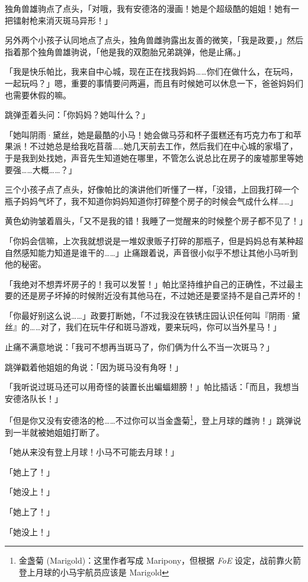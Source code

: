 独角兽雄驹点了点头，「对哦，我有安德洛的漫画！她是个超级酷的姐姐！她有一把镭射枪来消灭斑马异形！」

另外两个小孩子认同地点了点头，独角兽雌驹露出友善的微笑，「我是政要，」然后指着那个独角兽雄驹说，「他是我的双胞胎兄弟跳弹，他是止痛。」

「我是快乐帕比，我来自中心城，现在正在找我妈妈……你们在做什么，在玩吗，一起玩吗？」嗯，重要的事情要问两遍，而且有时候她可以休息一下，爸爸妈妈们也需要休假的嘛。

跳弹歪着头问：「你妈妈？她叫什么？」

「她叫阴雨·黛丝，她是最酷的小马！她会做马芬和杯子蛋糕还有巧克力布丁和苹果派！不过她总是给我吃苜蓿……她几天前去工作，然后我们在中心城的家塌了，于是我到处找她，声音先生知道她在哪里，不管怎么说总比在房子的废墟那里等她要强……大概……？」

三个小孩子点了点头，好像帕比的演讲他们听懂了一样，「没错，上回我打碎一个瓶子妈妈气坏了，我不知道你妈妈知道你打碎整个房子的时候会气成什么样……」

黄色幼驹皱着眉头，「又不是我的错！我睡了一觉醒来的时候整个房子都不见了！」

「你妈会信嘛，上次我就想说是一堆奴隶贩子打碎的那瓶子，但是妈妈总有某种超自然感知能力知道是谁干的……」止痛跟着说，声音很小似乎不想让其他小马听到他的秘密。

「我绝对不想弄坏房子的！我可以发誓！」帕比坚持维护自己的正确性，不过最主要的还是房子坏掉的时候附近没有其他马在，不过她还是要坚持不是自己弄坏的！

「你最好别这么说……」政要打断她，「不过我没在铁锈庄园认识任何叫『阴雨·黛丝』的……对了，我们在玩牛仔和斑马游戏，要来玩吗，你可以当外星马！」

止痛不满意地说：「我可不想再当斑马了，你们俩为什么不当一次斑马？」

跳弹戳着他姐姐的角说：「因为斑马没有角呀！」

「我听说过斑马还可以用奇怪的装置长出蝙蝠翅膀！」帕比插话：「而且，我想当安德洛队长！」

「但是你又没有安德洛的枪……不过你可以当金盏菊\footnote{金盏菊 (Marigold)：这里作者写成 Maripony，但根据 \emph{FoE} 设定，战前靠火箭登上月球的小马宇航员应该是 Marigold}，登上月球的雌驹！」跳弹说到一半就被她姐姐打断了。

「她从来没有登上月球！小马不可能去月球！」

「她上了！」

「她没上！」

「她上了！」

「她没上！」

